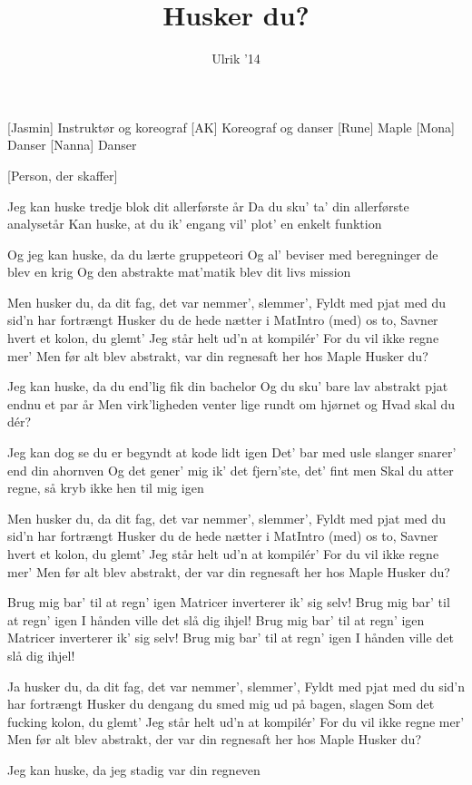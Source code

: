\documentclass[a4paper,11pt]{article}
\title{Husker du?}
\author{Ulrik '14}
\begin{document}
\maketitle

\begin{roles}
[Jasmin] Instruktør og koreograf
[AK] Koreograf og danser
[Rune] Maple
[Mona] Danser
[Nanna] Danser
\end{roles}

\begin{props}
[Person, der skaffer]
\end{props}


\begin{song}
%
Jeg kan huske tredje blok dit allerførste år
Da du sku' ta' din allerførste analysetår
Kan huske, at du ik' engang vil' plot' en enkelt funktion

%
Og jeg kan huske, da du lærte gruppeteori
Og al' beviser med beregninger de blev en krig
Og den abstrakte mat'matik blev dit livs mission

%
Men husker du, da dit fag, det var nemmer', slemmer',
Fyldt med pjat med du sid'n har fortrængt
Husker du de hede nætter i MatIntro (med) os to,
Savner hvert et kolon, du glemt'
Jeg står helt ud'n at kompilér'
For du vil ikke regne mer'
Men før alt blev abstrakt, var din regnesaft her hos Maple
Husker du?

%
Jeg kan huske, da du end'lig fik din bachelor
Og du sku' bare lav abstrakt pjat endnu et par år
Men virk'ligheden venter lige rundt om hjørnet og
Hvad skal du dér?

%
Jeg kan dog se du er begyndt at kode lidt igen
Det' bar med usle slanger snarer' end din ahornven
Og det gener' mig ik' det fjern'ste, det' fint men
Skal du atter regne, så kryb ikke hen til mig igen

%
Men husker du, da dit fag, det var nemmer', slemmer',
Fyldt med pjat med du sid'n har fortrængt
Husker du de hede nætter i MatIntro (med) os to,
Savner hvert et kolon, du glemt'
Jeg står helt ud'n at kompilér'
For du vil ikke regne mer'
Men før alt blev abstrakt, der var din regnesaft her hos Maple
Husker du?

%
Brug mig bar' til at regn' igen
Matricer inverterer ik' sig selv!
Brug mig bar' til at regn' igen
I hånden ville det slå dig ihjel!
Brug mig bar' til at regn' igen
Matricer inverterer ik' sig selv!
Brug mig bar' til at regn' igen
I hånden ville det slå dig ihjel!

%
Ja husker du, da dit fag, det var nemmer', slemmer',
Fyldt med pjat med du sid'n har fortrængt
Husker du dengang du smed mig ud på bagen, slagen
Som det fucking kolon, du glemt'
Jeg står helt ud'n at kompilér'
For du vil ikke regne mer'
Men før alt blev abstrakt, der var din regnesaft her hos Maple
Husker du?

%
Jeg kan huske, da jeg stadig var din regneven
\end{song}
\end{document}
